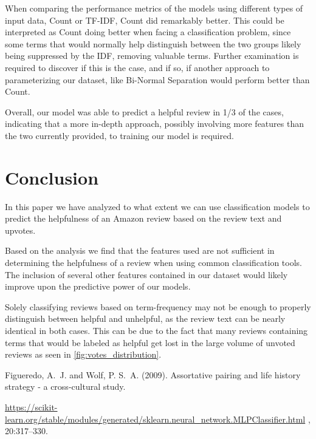 \documentclass[twoside,twocolumn]{article}
\begin{document}
When comparing the performance metrics of the models using different types of input data, Count or TF-IDF, Count did remarkably better. This could be interpreted as Count doing better when facing a classification problem, since some terms that would normally help distinguish between the two groups likely being suppressed by the IDF, removing valuable terms. Further examination is required to discover if this is the case, and if so, if another approach to parameterizing our dataset, like Bi-Normal Separation would perform better than Count.

Overall, our model was able to predict a helpful review in 1/3 of the cases, indicating that a more in-depth approach, possibly involving more features than the two currently provided, to training our model is required.

\section{Conclusion}
In this paper we have analyzed to what extent we can use classification models to predict the helpfulness of an Amazon review based on the review text and upvotes.

Based on the analysis we find that the features used are not sufficient in determining the helpfulness of a review when using common classification tools. The inclusion of several other features contained in our dataset would likely improve upon the predictive power of our models.

Solely classifying reviews based on term-frequency may not be enough to properly distinguish between helpful and unhelpful, as the review text can be nearly identical in both cases. This can be due to the fact that many reviews containing terms that would be labeled as helpful get lost in the large volume of unvoted reviews as seen in \figurename{\ref{fig:votes_distribution}}.



\begin{thebibliography}{99} %

	Figueredo, A.~J. and Wolf, P. S.~A. (2009).
	\newblock Assortative pairing and life history strategy - a cross-cultural
	study.

	\url{https://scikit-learn.org/stable/modules/generated/sklearn.neural_network.MLPClassifier.html} , 20:317--330.

\end{thebibliography}

\end{document}
